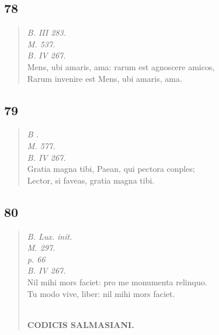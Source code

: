 \documentclass[11pt, a4paper]{report}
\begin{document}
            \subsection*{78}
      \begin{verse}
      \textit{B. III 283.} \\ \textit{M. 537.} \\ \textit{B. IV 267.} \\ Mens, ubi amaris, ama: rarum est agnoscere amicos, \\ Rarum invenire  \lbrack est \rbrack  Mens, ubi amaris, ama. \\ 
      \end{verse}
  
            \subsection*{79}
      \begin{verse}
      \textit{B .} \\ \textit{M. 577.} \\ \textit{B. IV 267.} \\ Gratia magna tibi, Paean, qui pectora conples; \\ Lector, si faveas, gratia magna tibi. \\ 
      \end{verse}
  
            \subsection*{80}
      \begin{verse}
      \textit{B. Lux. init.} \\ \textit{M. 297.} \\ \textit{p. 66} \\ \textit{B. IV 267.} \\ Nil mihi mors faciet: pro me monumenta relinquo. \\ Tu modo vive, liber: nil mihi mors faciet. \\ 
        ﻿\pagebreak 
    \begin{center} \textbf{CODICIS SALMASIANI.} \end{center} \marginpar{[111]} 
      \end{verse}
  
\end{document}
